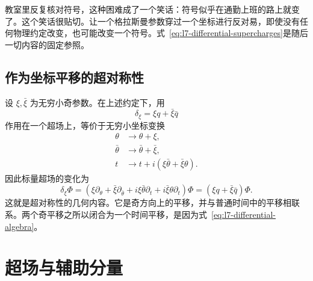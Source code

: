 教室里反复核对符号，这种困难成了一个笑话：符号似乎在通勤上班的路上就变了。这个笑话很贴切。让一个格拉斯曼参数穿过一个坐标进行反对易，即使没有任何物理约定改变，也可能改变一个符号。式~\eqref{eq:l7-differential-supercharges}是随后一切内容的固定参照。

\subsection{作为坐标平移的超对称性}

设 \(\xi,\bar\xi\) 为无穷小奇参数。在上述约定下，用
\begin{equation}
\delta_\xi=\xi q+\bar\xi\bar q
\end{equation}
作用在一个超场上，等价于无穷小坐标变换
\begin{align}
\theta&\longrightarrow\theta+\xi,\\
\bar\theta&\longrightarrow\bar\theta+\bar\xi,\\
t&\longrightarrow t+i\left(\xi\bar\theta+\bar\xi\theta\right).
\label{eq:l7-coordinate-shift}
\end{align}
因此标量超场的变化为
\begin{equation}
\delta_\xi\Phi
=\left(\xi\partial_\theta+\bar\xi\partial_{\bar\theta}
+i\xi\bar\theta\partial_t+i\bar\xi\theta\partial_t\right)\Phi
=\left(\xi q+\bar\xi\bar q\right)\Phi.
\end{equation}
这就是超对称性的几何内容。它是奇方向上的平移，并与普通时间中的平移相联系。两个奇平移之所以闭合为一个时间平移，是因为式~\eqref{eq:l7-differential-algebra}。

\begin{classroomqa}
\end{classroomqa}

\begin{classroomqa}
\end{classroomqa}

\section{超场与辅助分量}

